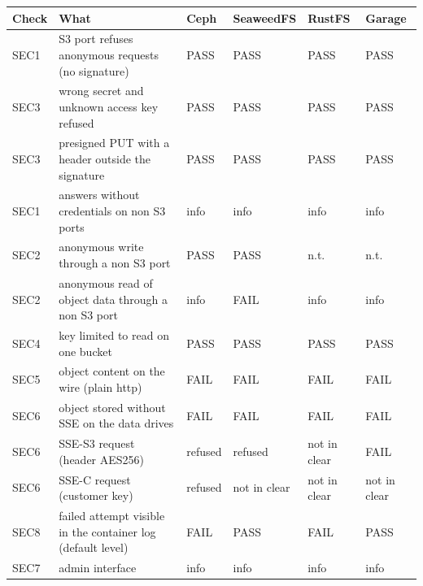 \begin{tabular}{@{}llllll@{}}
\toprule
Check & What & Ceph & SeaweedFS & RustFS & Garage \\
\midrule
SEC1 & S3 port refuses anonymous requests (no signature) & PASS & PASS & PASS & PASS \\
SEC3 & wrong secret and unknown access key refused & PASS & PASS & PASS & PASS \\
SEC3 & presigned PUT with a header outside the signature & PASS & PASS & PASS & PASS \\
SEC1 & answers without credentials on non S3 ports & info & info & info & info \\
SEC2 & anonymous write through a non S3 port & PASS & PASS & n.t. & n.t. \\
SEC2 & anonymous read of object data through a non S3 port & info & FAIL & info & info \\
SEC4 & key limited to read on one bucket & PASS & PASS & PASS & PASS \\
SEC5 & object content on the wire (plain http) & FAIL & FAIL & FAIL & FAIL \\
SEC6 & object stored without SSE on the data drives & FAIL & FAIL & FAIL & FAIL \\
SEC6 & SSE-S3 request (header AES256) & refused & refused & not in clear & FAIL \\
SEC6 & SSE-C request (customer key) & refused & not in clear & not in clear & not in clear \\
SEC8 & failed attempt visible in the container log (default level) & FAIL & PASS & FAIL & PASS \\
SEC7 & admin interface & info & info & info & info \\
\bottomrule
\end{tabular}
